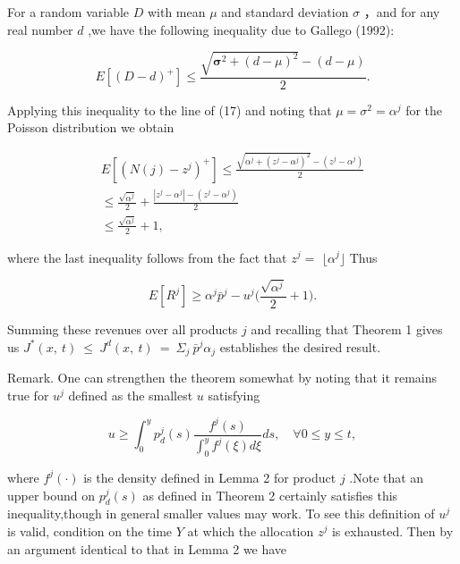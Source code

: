 For a random variable \(D\) with mean \(\mu\) and standard deviation
\(\sigma\) ，and for any real number \(d\) ,we have the following
inequality due to Gallego (1992):

\[
E [ ( D - d ) ^ { + } ] \leqslant \frac { \sqrt { \pmb { \sigma } ^ { 2 } + ( d - \mu ) ^ { 2 } } - ( d - \mu ) } { 2 } .
\]

Applying this inequality to the line of (17) and noting that
\(\mu = \sigma ^ { 2 } = \alpha ^ { j }\) for the Poisson distribution
we obtain

\[
\begin{array} { c } { { E [ ( N ( j ) - z ^ { j } ) ^ { + } ] \leqslant \displaystyle \frac { \sqrt { \alpha ^ { j } + ( z ^ { j } - \alpha ^ { j } ) ^ { 2 } } - ( z ^ { j } - \alpha ^ { j } ) } { 2 } } } \\ { { \displaystyle \leqslant \displaystyle \frac { \sqrt { \alpha ^ { j } } } { 2 } + \frac { | z ^ { j } - \alpha ^ { j } | - ( z ^ { j } - \alpha ^ { j } ) } { 2 } } } \\ { { \displaystyle \leqslant \displaystyle \frac { \sqrt { \alpha ^ { j } } } { 2 } + 1 , } } \end{array}
\]

where the last inequality follows from the fact that \(z ^ { j } =\)
\(\lfloor \alpha ^ { j } \rfloor\) Thus

\[
E [ R ^ { j } ] \geqslant \alpha ^ { j } \bar { p } ^ { j } - u ^ { j } \biggl ( \frac { \sqrt { \alpha ^ { j } } } { 2 } + 1 \biggr ) .
\]

Summing these revenues over all products \(j\) and recalling that
Theorem 1 gives us
\(J ^ { * } ( x , \ t ) \ \leqslant \ J ^ { d } ( x , \ t ) \ = \ \Sigma _ { j } \ \bar { p } ^ { j } \alpha _ { j }\)
establishes the desired result.

Remark. One can strengthen the theorem somewhat by noting that it
remains true for \(u ^ { j }\) defined as the smallest \(u\) satisfying

\[
u \geqslant \int _ { 0 } ^ { y } p _ { d } ^ { j } ( s ) \frac { f ^ { j } ( s ) } { \int _ { 0 } ^ { y } f ^ { j } ( \xi ) d \xi } d s , \quad \forall 0 \leqslant y \leqslant t ,
\]

where \(f ^ { j } ( \cdot )\) is the density defined in Lemma 2 for
product \(j\) .Note that an upper bound on \(p _ { d } ^ { j } ( s )\)
as defined in Theorem 2 certainly satisfies this inequality,though in
general smaller values may work. To see this definition of \(u ^ { j }\)
is valid, condition on the time \(Y\) at which the allocation
\(z ^ { j }\) is exhausted. Then by an argument identical to that in
Lemma 2 we have

